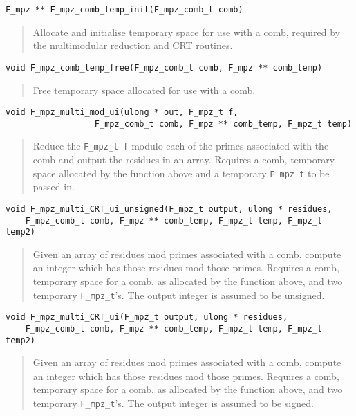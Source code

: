 \documentclass[a4paper,10pt]{article}
\newcommand{\code}{\lstinline}
\begin{document}
\begin{lstlisting}
F_mpz ** F_mpz_comb_temp_init(F_mpz_comb_t comb)
\end{lstlisting}
\begin{quote}
Allocate and initialise temporary space for use with a comb, required by the multimodular reduction and CRT routines.
\end{quote}

\begin{lstlisting}
void F_mpz_comb_temp_free(F_mpz_comb_t comb, F_mpz ** comb_temp)
\end{lstlisting}
\begin{quote}
Free temporary space allocated for use with a comb.
\end{quote}

\begin{lstlisting}
void F_mpz_multi_mod_ui(ulong * out, F_mpz_t f, 
                  F_mpz_comb_t comb, F_mpz ** comb_temp, F_mpz_t temp)
\end{lstlisting}
\begin{quote}
Reduce the \code{F_mpz_t f} modulo each of the primes associated with the comb and output the residues in an array. Requires a comb, temporary space allocated by the function above and a temporary \code{F_mpz_t} to be passed in.
\end{quote}

\begin{lstlisting}
void F_mpz_multi_CRT_ui_unsigned(F_mpz_t output, ulong * residues, 
    F_mpz_comb_t comb, F_mpz ** comb_temp, F_mpz_t temp, F_mpz_t temp2)
\end{lstlisting}
\begin{quote}
Given an array of residues mod primes associated with a comb, compute an integer which has those residues mod those primes. Requires a comb, temporary space for a comb, as allocated by the function above, and two temporary \code{F_mpz_t}'s. The output integer is assumed to be unsigned.
\end{quote}

\begin{lstlisting}
void F_mpz_multi_CRT_ui(F_mpz_t output, ulong * residues, 
    F_mpz_comb_t comb, F_mpz ** comb_temp, F_mpz_t temp, F_mpz_t temp2)
\end{lstlisting}
\begin{quote}
Given an array of residues mod primes associated with a comb, compute an integer which has those residues mod those primes. Requires a comb, temporary space for a comb, as allocated by the function above, and two temporary \code{F_mpz_t}'s. The output integer is assumed to be signed.
\end{quote}
\end{document}
